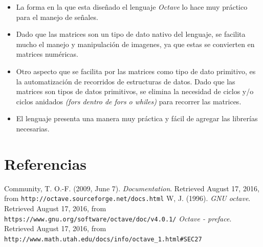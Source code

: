 \documentclass{IEEEtran}
\begin{document}
\begin{itemize}
\item La forma en la que esta dise\~nado el lenguaje \emph{Octave} lo hace muy pr\'actico para el manejo de se\~nales.
\item Dado que las matrices son un tipo de dato nativo del lenguaje, se facilita mucho el manejo y manipulaci\'on de imagenes, ya que estas se convierten en matrices num\'ericas.
\item Otro aspecto que se facilita por las matrices como tipo de dato primitivo, es la automatizaci\'on de recorridos de estructuras de datos. Dado que las matrices son tipos de datos primitivos, se elimina la necesidad de ciclos y/o ciclos anidados \emph{(fors dentro de fors o whiles)} para recorrer las matrices.
\item El lenguaje presenta una manera muy pr\'actica y f\'acil de agregar las librer\'ias necesarias.
\end{itemize}

\section{Referencias}

\begin{thebibliography}{99}

 Community, T. O.-F. (2009, June 7). \emph{Documentation}. Retrieved August 17, 2016, from \texttt{http://octave.sourceforge.net/docs.html}
 W, J. (1996). \emph{GNU octave}. Retrieved August 17, 2016, from \texttt{https://www.gnu.org/software/octave/doc/v4.0.1/}
 \emph{Octave - preface}. Retrieved August 17, 2016, from \texttt{http://www.math.utah.edu/docs/info/octave\_1.html\#SEC27}
\end{thebibliography}
\end{document}
